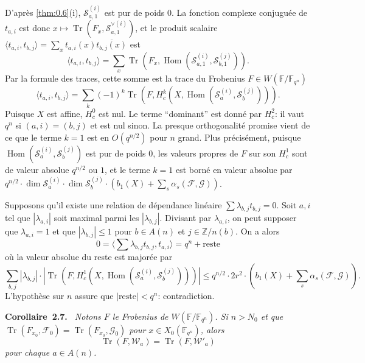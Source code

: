 \documentclass[10pt,a4paper]{article}
\makeatletter
\theoremstyle{plain}
\theoremstyle{definition}
\newenvironment{manualblock}[4]{%
  \par\medskip\noindent\textbf{#1~#2#3.}\def\@currentlabel{#2}\label{#4}\itshape\ }{\par\normalfont\medskip}
\DeclareMathOperator{\Hom}{Hom}
\DeclareMathOperator{\tr}{Tr}
\makeatother
\begin{document}
D'apr\`es \ref{thm:0.6}(i), $\mathcal{S}_{a,1}^{(i)}$ est pur de poids $0$. La fonction complexe conjugu\'ee de $t_{a,i}$ est donc $x \mapsto \tr(F_x, \mathcal{S}_{a,1}^{\vee(i)})$, et le produit scalaire $\langle t_{a,i}, t_{b,j} \rangle = \sum_x t_{a,i}(x) \overline{t_{b,j}(x)}$ est
\[
\langle t_{a,i}, t_{b,j} \rangle = \sum_x \tr(F_x, \Hom(\mathcal{S}_{a,1}^{(i)}, \mathcal{S}_{b,1}^{(j)})).
\]
Par la formule des traces, cette somme est la trace du Frobenius $F \in W(\mathbb{F}/\mathbb{F}_{q^n})$
\begin{equation}\label{eq:2.6.1}
\langle t_{a,i}, t_{b,j} \rangle = \sum_k (-1)^k \tr(F, H_c^k(X, \Hom(\mathcal{S}_a^{(i)}, \mathcal{S}_b^{(j)}))).
\end{equation}
Puisque $X$ est affine, $H_c^0$ est nul. Le terme ``dominant'' est donn\'e par $H_c^2$: il vaut $q^n$ si $(a,i) = (b,j)$ et est nul sinon. La presque orthogonalit\'e promise vient de ce que le terme $k=1$ est en $O(q^{n/2})$ pour $n$ grand. Plus pr\'ecis\'ement, puisque $\Hom(\mathcal{S}_a^{(i)}, \mathcal{S}_b^{(j)})$ est pur de poids $0$, les valeurs propres de $F$ sur son $H_c^1$ sont de valeur absolue $q^{n/2}$ ou $1$, et le terme $k=1$ est born\'e en valeur absolue par $q^{n/2} \cdot \dim \mathcal{S}_a^{(i)} \cdot \dim \mathcal{S}_b^{(j)} \cdot (b_1(X) + \sum_s \alpha_s(\mathcal{F}, \mathcal{G}))$.

Supposons qu'il existe une relation de d\'ependance lin\'eaire $\sum \lambda_{b,j} t_{b,j} = 0$. Soit $a,i$ tel que $|\lambda_{a,i}|$ soit maximal parmi les $|\lambda_{b,j}|$. Divisant par $\lambda_{a,i}$, on peut supposer que $\lambda_{a,i} = 1$ et que $|\lambda_{b,j}| \leq 1$ pour $b \in A(n)$ et $j \in \mathbb{Z}/n(b)$. On a alors
\[
0 = \langle \sum \lambda_{b,j} t_{b,j}, t_{a,i} \rangle = q^n + \text{reste}
\]
o\`u la valeur absolue du reste est major\'ee par
\[
\sum_{b,j} |\lambda_{b,j}| \cdot |\tr(F, H_c^1(X, \Hom(\mathcal{S}_a^{(i)}, \mathcal{S}_b^{(j)})))| \leq q^{n/2} \cdot 2r^2 \cdot (b_1(X) + \sum_s \alpha_s(\mathcal{F}, \mathcal{G})).
\]
L'hypoth\`ese sur $n$ assure que $|\text{reste}| < q^n$: contradiction.

\begin{manualblock}{Corollaire}{2.7}{}{cor:2.7}
Notons $F$ le Frobenius de $W(\mathbb{F}/\mathbb{F}_{q^n})$. Si $n > N_0$ et que $\tr(F_{x_0}, \mathcal{F}_0) = \tr(F_{x_0}, \mathcal{G}_0)$ pour $x \in X_0(\mathbb{F}_{q^n})$, alors
\[
\tr(F, \mathcal{W}_a) = \tr(F, \mathcal{W}'_a)
\]
pour chaque $a \in A(n)$.
\end{manualblock}
\end{document}
